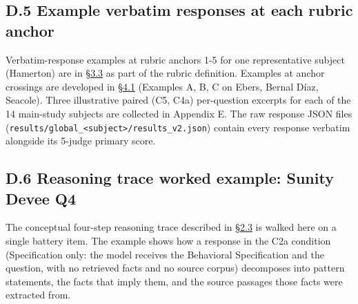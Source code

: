 \hypertarget{d.5-example-verbatim-responses-at-each-rubric-anchor}{%
\subsection{D.5 Example verbatim responses at each rubric
anchor}\label{d.5-example-verbatim-responses-at-each-rubric-anchor}}

Verbatim-response examples at rubric anchors 1-5 for one representative
subject (Hamerton) are in \hyperref[scoring-rubric-with-calibrated-llm-judge-panel]{§3.3} as part of the rubric definition.
Examples at anchor crossings are developed in \hyperref[the-cross-subject-gradient-and-its-per-question-mechanism]{§4.1} (Examples A, B, C on
Ebers, Bernal Díaz, Seacole). Three illustrative paired (C5, C4a)
per-question excerpts for each of the 14 main-study subjects are
collected in Appendix E. The raw response JSON files
(\texttt{results/global\_\textless{}subject\textgreater{}/results\_v2.json})
contain every response verbatim alongside its 5-judge primary score.

\hypertarget{d.6-reasoning-trace-worked-example-sunity-devee-q4}{%
\subsection{D.6 Reasoning trace worked example: Sunity Devee
Q4}\label{d.6-reasoning-trace-worked-example-sunity-devee-q4}}

The conceptual four-step reasoning trace described in \hyperref[traceability-and-reasoning-traces]{§2.3} is walked
here on a single battery item. The example shows how a response in the
C2a condition (Specification only: the model receives the Behavioral
Specification and the question, with no retrieved facts and no source
corpus) decomposes into pattern statements, the facts that imply them,
and the source passages those facts were extracted from.

